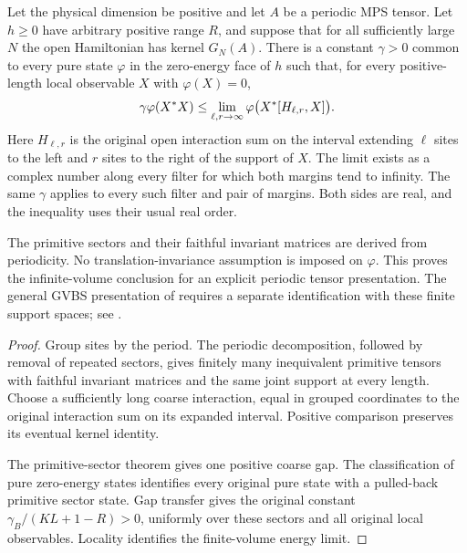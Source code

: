 \begin{lemma}
    \label{thm:periodic_quasi_local_ground_state_gap}
    \leanok
    Let the physical dimension be positive and let $A$ be a periodic MPS tensor.
    Let $h\geq0$ have arbitrary positive range $R$, and suppose that for all
    sufficiently large $N$ the open Hamiltonian has kernel $G_N(A)$.
    There is a constant $\gamma>0$ common to every pure state $\varphi$ in the
    zero-energy face of $h$ such that, for every positive-length local observable
    $X$ with $\varphi(X)=0$,
    \begin{align}
        \gamma\varphi(X^*X)
        \leq\lim_{\ell,r\to\infty}\varphi\bigl(X^*[H_{\ell,r},X]\bigr).
        \notag
    \end{align}
    Here $H_{\ell,r}$ is the original open interaction sum on the interval extending
    $\ell$ sites to the left and $r$ sites to the right of the support of $X$.
    The limit exists as a complex number along every filter for which both margins
    tend to infinity. The same $\gamma$ applies to every such filter and pair
    of margins. Both sides are real, and the inequality uses their usual real order.

    The primitive sectors and their faithful invariant matrices are derived from
    periodicity. No translation-invariance assumption is imposed on $\varphi$.
    This proves the infinite-volume conclusion for an explicit periodic tensor
    presentation. The general GVBS presentation of
    \cite[Theorem~1.2]{Nachtergaele1996Spectral} requires a separate identification
    with these finite support spaces; see
    \cite{gap:nachtergaele96_infinite_volume_ground_projection}.
\end{lemma}
\begin{proof}\leanok
    Group sites by the period. The periodic decomposition, followed by removal of
    repeated sectors, gives finitely many inequivalent primitive tensors with
    faithful invariant matrices and the same joint support at every length.
    Choose a sufficiently long coarse interaction, equal in grouped coordinates
    to the original interaction sum on its expanded interval. Positive comparison
    preserves its eventual kernel identity.

    The primitive-sector theorem gives one positive coarse gap. The classification
    of pure zero-energy states identifies every original pure state with a
    pulled-back primitive sector state. Gap transfer gives the original constant
    $\gamma_B/(KL+1-R)>0$, uniformly over these sectors and all original local
    observables. Locality identifies the finite-volume energy limit.
\end{proof}


